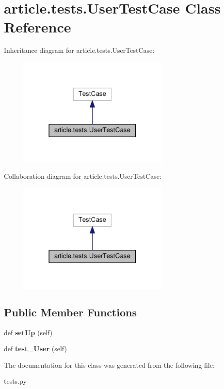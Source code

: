 \hypertarget{classarticle_1_1tests_1_1UserTestCase}{}\section{article.\+tests.\+User\+Test\+Case Class Reference}
\label{classarticle_1_1tests_1_1UserTestCase}


Inheritance diagram for article.\+tests.\+User\+Test\+Case\+:
\nopagebreak
\begin{figure}[H]
\begin{center}
\leavevmode
\includegraphics[width=214pt]{classarticle_1_1tests_1_1UserTestCase__inherit__graph}
\end{center}
\end{figure}


Collaboration diagram for article.\+tests.\+User\+Test\+Case\+:
\nopagebreak
\begin{figure}[H]
\begin{center}
\leavevmode
\includegraphics[width=214pt]{classarticle_1_1tests_1_1UserTestCase__coll__graph}
\end{center}
\end{figure}
\subsection*{Public Member Functions}
\begin{DoxyCompactItemize}
\item 
\hypertarget{classarticle_1_1tests_1_1UserTestCase_a54377c8aa9dfd39345985593c42e4fa0}{}def {\bfseries set\+Up} (self)\label{classarticle_1_1tests_1_1UserTestCase_a54377c8aa9dfd39345985593c42e4fa0}

\item 
\hypertarget{classarticle_1_1tests_1_1UserTestCase_a0f6b99c4291fc4880d41a2013c083530}{}def {\bfseries test\+\_\+\+User} (self)\label{classarticle_1_1tests_1_1UserTestCase_a0f6b99c4291fc4880d41a2013c083530}

\end{DoxyCompactItemize}


The documentation for this class was generated from the following file\+:\begin{DoxyCompactItemize}
\item 
tests.\+py\end{DoxyCompactItemize}
